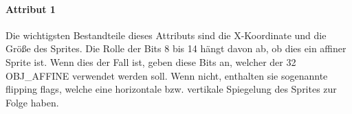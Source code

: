 \paragraph{Attribut 1}
Die wichtigsten Bestandteile dieses Attributs sind die X-Koordinate und die Größe des Sprites. Die Rolle der Bits 8 bis 14 hängt davon ab, ob dies ein affiner Sprite ist. Wenn dies der Fall ist, geben diese Bits an, welcher der 32 OBJ\_AFFINE verwendet werden soll. Wenn nicht, enthalten sie sogenannte flipping flags, welche eine horizontale bzw. vertikale Spiegelung des Sprites zur Folge haben.
